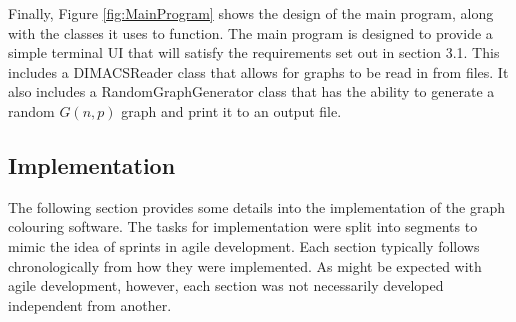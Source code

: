 Finally, Figure \ref{fig:MainProgram} shows the design of the main program, along with the classes it uses to function. The main program is designed to provide a simple terminal UI that will satisfy the requirements set out in section 3.1. This includes a DIMACSReader class that allows for graphs to be read in from files. It also includes a RandomGraphGenerator class that has the ability to generate a random $G(n, p)$ graph and print it to an output file. 

\subsection{Implementation}
The following section provides some details into the implementation of the graph colouring software. The tasks for implementation were split into segments to mimic the idea of sprints in agile development. Each section typically follows chronologically from how they were implemented. As might be expected with agile development, however, each section was not necessarily developed independent from another. 

